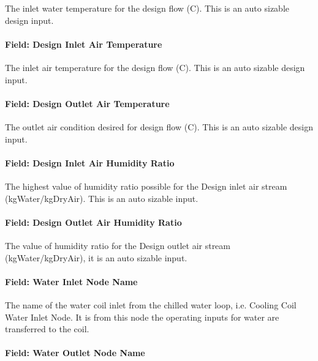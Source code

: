 The inlet water temperature for the design flow (C). This is an auto sizable design input.

\paragraph{Field: Design Inlet Air Temperature}\label{field-design-inlet-air-temperature}

The inlet air temperature for the design flow (C). This is an auto sizable design input.

\paragraph{Field: Design Outlet Air Temperature}\label{field-design-outlet-air-temperature}

The outlet air condition desired for design flow (C). This is an auto sizable design input.

\paragraph{Field: Design Inlet Air Humidity Ratio}\label{field-design-inlet-air-humidity-ratio}

The highest value of humidity ratio possible for the Design inlet air stream (kgWater/kgDryAir). This is an auto sizable input.

\paragraph{Field: Design Outlet Air Humidity Ratio}\label{field-design-outlet-air-humidity-ratio}

The value of humidity ratio for the Design outlet air stream (kgWater/kgDryAir), it is an auto sizable input.

\paragraph{Field: Water Inlet Node Name}\label{field-water-inlet-node-name-000}

The name of the water coil inlet from the chilled water loop, i.e. Cooling Coil Water Inlet Node. It is from this node the operating inputs for water are transferred to the coil.

\paragraph{Field: Water Outlet Node Name}\label{field-water-outlet-node-name-000}


